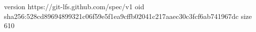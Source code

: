 version https://git-lfs.github.com/spec/v1
oid sha256:528cd89694899321c06f59e5f1ea9cffb02041c217aaec30c3fcf6ab741967dc
size 610
